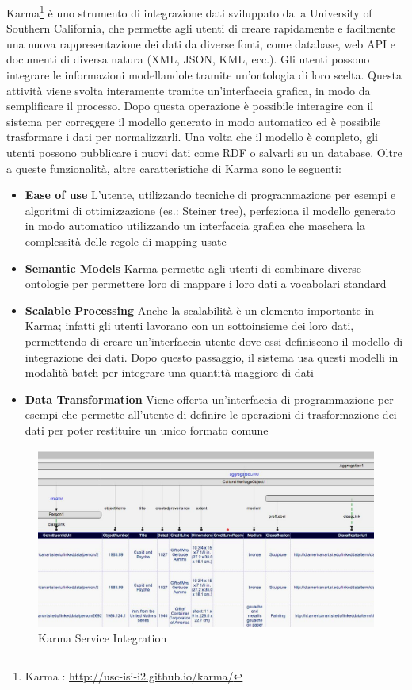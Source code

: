 Karma\footnote{Karma : \url{http://usc-isi-i2.github.io/karma/}} è uno strumento di integrazione dati sviluppato dalla University of Southern California, che permette agli utenti di creare rapidamente e facilmente una nuova rappresentazione dei dati  da diverse fonti, come database, web API e documenti di diversa natura (XML, JSON, KML, ecc.). Gli utenti possono integrare le informazioni modellandole tramite un'ontologia di loro scelta. Questa attività viene svolta interamente tramite un'interfaccia grafica, in modo da semplificare il processo. 
Dopo questa operazione è possibile interagire con il sistema per correggere il modello generato in modo automatico ed è possibile trasformare i dati per normalizzarli. Una volta che il modello è completo, gli utenti possono pubblicare i nuovi dati come RDF o salvarli su un database.
Oltre a queste funzionalità, altre caratteristiche di Karma sono le seguenti: 
\begin{itemize}
		\item \textbf{Ease of use} L'utente, utilizzando tecniche di programmazione per esempi e algoritmi  di ottimizzazione (es.: Steiner tree), perfeziona il modello generato in modo automatico utilizzando un interfaccia grafica che maschera la complessità delle regole di mapping usate
		\item \textbf{Semantic Models} Karma permette agli utenti di combinare diverse ontologie per permettere loro di mappare i loro dati a vocabolari standard
		\item \textbf{Scalable Processing} Anche la scalabilità è un elemento importante in Karma; infatti gli utenti lavorano con un sottoinsieme dei loro dati, permettendo di creare un'interfaccia utente dove essi definiscono il modello di integrazione dei dati. Dopo questo passaggio, il sistema usa questi modelli in modalità batch per integrare una quantità maggiore di dati
		\item \textbf{Data Transformation} Viene offerta un'interfaccia di programmazione per esempi che permette all'utente di definire le operazioni di trasformazione dei dati per poter restituire un unico formato comune
\end{itemize}

\begin{figure}[ht]
	\centering
	\includegraphics[width=\textwidth]{2-nozioni-preliminari/Immagini/karma-europeana.jpg}
	\caption{Karma Service Integration}\label{fig:karma-europeana}
\end{figure}

